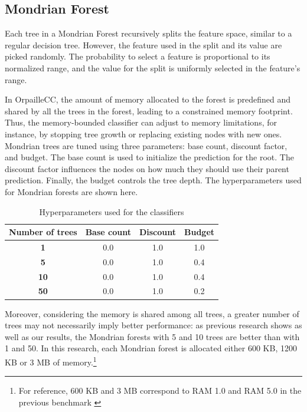 \documentclass[conference]{IEEEtran}
\begin{document}
\subsection{Mondrian Forest}
Each tree in a Mondrian Forest recursively splits the feature space, similar to a regular decision tree. However, the feature used in the split and its value are picked randomly. The probability to select a feature is proportional to its normalized range, and the value for the split is uniformly selected in the feature's range. \par
In OrpailleCC, the amount of memory allocated to the forest is predefined and shared by all the trees in the forest, leading to a constrained memory footprint. Thus, the memory-bounded classifier can adjust to memory limitations, for instance, by stopping tree growth or replacing existing nodes with new ones. Mondrian trees are tuned using three parameters: base count, discount factor, and budget. The base count is used to initialize the prediction for the root. The discount factor influences the nodes on how much they should use their parent prediction. \cite{khannouz2020benchmark} Finally, the budget controls the tree depth. The hyperparameters used for Mondrian forests are shown here. 
\begin{table}[htbp]
\caption{Hyperparameters used for the classifiers}
\begin{center}
\begin{tabular}{|c|c|c|c|}
\hline
\textbf{Number of trees} & \textbf{Base count}& \textbf{Discount}& \textbf{Budget} \\
\hline
\textbf{1} & 0.0 & 1.0 & 1.0\\
\textbf{5} & 0.0 & 1.0 & 0.4\\
\textbf{10} & 0.0 & 1.0 & 0.4\\
\textbf{50} & 0.0 & 1.0 & 0.2\\
\hline
\end{tabular}
\label{tab1}
\end{center}
\end{table}
Moreover, considering the memory is shared among all trees, a greater number of trees may not necessarily imply better performance: as previous research \cite{khannouz2020benchmark} shows as well as our results, the Mondrian forests with 5 and 10 trees are better than with 1 and 50. In this research, each Mondrian forest is allocated either 600 KB, 1200 KB or 3 MB of memory.\footnote{For reference, 600 KB and 3 MB correspond to RAM 1.0 and RAM 5.0 in the previous benchmark \cite{khannouz2020benchmark}}
\end{document}
